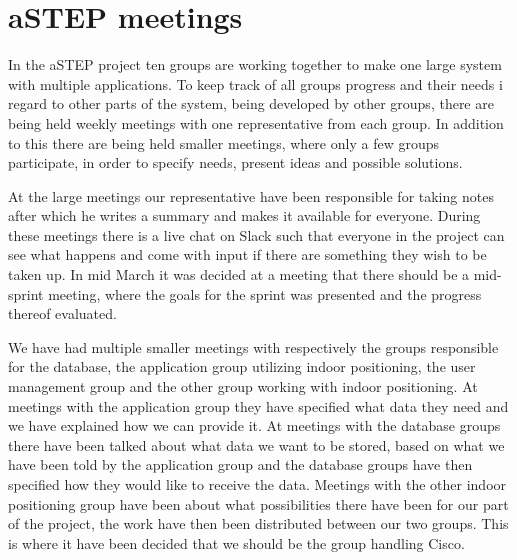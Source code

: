 \section{aSTEP meetings}
In the aSTEP project ten groups are working together to make one large system with multiple applications. To keep track of all groups progress and their needs i regard to other parts of the system, being developed by other groups, there are being held weekly meetings with one representative from each group. In addition to this there are being held smaller meetings, where only a few groups participate, in order to specify needs, present ideas and possible solutions.

At the large meetings our representative have been responsible for taking notes after which he writes a summary and makes it available for everyone. During these meetings there is a live chat on Slack such that everyone in the project can see what happens and come with input if there are something they wish to be taken up. In mid March it was decided at a meeting that there should be a mid-sprint meeting, where the goals for the sprint was presented and the progress thereof evaluated.

We have had multiple smaller meetings with respectively the groups responsible for the database, the application group utilizing indoor positioning, the user management group and the other group working with indoor positioning. 
At meetings with the application group they have specified what data they need and we have explained how we can provide it. 
At meetings with the database groups there have been talked about what data we want to be stored, based on what we have been told by the application group and the database groups have then specified how they would like to receive the data. 
Meetings with the other indoor positioning group have been about what possibilities there have been for our part of the project, the work have then been distributed between our two groups. This is where it have been decided that we should be the group handling Cisco.

